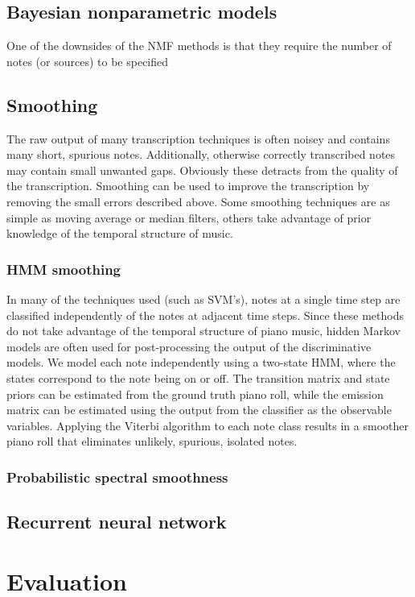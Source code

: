 \documentclass[5p]{elsarticle}
\begin{document}
\subsection{Bayesian nonparametric models}
One of the downsides of the NMF methods is that they require the number of notes (or sources) to be specified 


\subsection{Smoothing}
The raw output of many transcription techniques is often noisey and contains many short, spurious notes. Additionally, otherwise correctly transcribed notes may contain small unwanted gaps. Obviously these detracts from the quality of the transcription. Smoothing can be used to improve the transcription by removing the small errors described above. Some smoothing techniques are as simple as moving average or median filters, others take advantage of prior knowledge of the temporal structure of music.

\subsubsection{HMM smoothing}
In many of the techniques used (such as SVM's), notes at a single time step are classified independently of the notes at adjacent time steps. Since these methods do not take advantage of the temporal structure of piano music, hidden Markov models are often used for post-processing the output of the discriminative models. We model each note independently using a two-state HMM, where the states correspond to the note being on or off. The transition matrix and state priors can be estimated from the ground truth piano roll, while the emission matrix can be estimated using the output from the classifier as the observable variables. Applying the Viterbi algorithm to each note class results in a smoother piano roll that eliminates unlikely, spurious, isolated notes. 

\subsubsection{Probabilistic spectral smoothness}


\subsection{Recurrent neural network}

\section{Evaluation}
\end{document}
